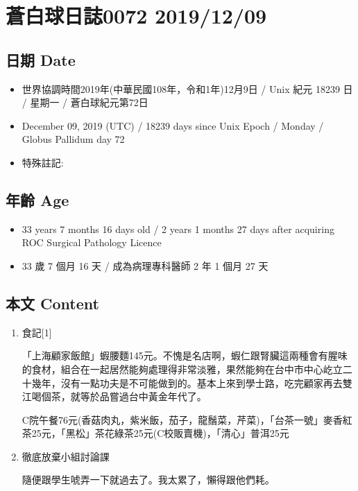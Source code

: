 \documentclass[
]{article}
\providecommand{\tightlist}{%
  \setlength{\itemsep}{0pt}\setlength{\parskip}{0pt}}
\begin{document}
\hypertarget{ux84bcux767dux7403ux65e5ux8a8c0072-20191209}{%
\section{蒼白球日誌0072
2019/12/09}\label{ux84bcux767dux7403ux65e5ux8a8c0072-20191209}}

\hypertarget{ux65e5ux671f-date-8}{%
\subsection{日期 Date}\label{ux65e5ux671f-date-8}}

\begin{itemize}
\tightlist
\item
  世界協調時間2019年(中華民國108年，令和1年)12月9日 / Unix 紀元 18239 日
  / 星期一 / 蒼白球紀元第72日
\item
  December 09, 2019 (UTC) / 18239 days since Unix Epoch / Monday /
  Globus Pallidum day 72
\item
  特殊註記:
\end{itemize}

\hypertarget{ux5e74ux9f61-age-8}{%
\subsection{年齡 Age}\label{ux5e74ux9f61-age-8}}

\begin{itemize}
\tightlist
\item
  33 years 7 months 16 days old / 2 years 1 months 27 days after
  acquiring ROC Surgical Pathology Licence
\item
  33 歲 7 個月 16 天 / 成為病理專科醫師 2 年 1 個月 27 天
\end{itemize}

\hypertarget{ux672cux6587-content-8}{%
\subsection{本文 Content}\label{ux672cux6587-content-8}}

\begin{enumerate}
\def\labelenumi{\arabic{enumi}.}
\item
  食記{[}1{]}

  「上海顧家飯館」蝦腰麵145元。不愧是名店啊，蝦仁跟腎臟這兩種會有腥味的食材，組合在一起居然能夠處理得非常淡雅，果然能夠在台中市中心屹立二十幾年，沒有一點功夫是不可能做到的。基本上來到學士路，吃完顧家再去雙江喝個茶，就等於品嘗過台中黃金年代了。

  C院午餐76元(香菇肉丸，紫米飯，茄子，龍鬚菜，芹菜)，「台茶一號」麥香紅茶25元，「黑松」茶花綠茶25元(C校販賣機)，「清心」普洱25元
\item
  徹底放棄小組討論課

  隨便跟學生唬弄一下就過去了。我太累了，懶得跟他們耗。
\end{enumerate}
\end{document}
